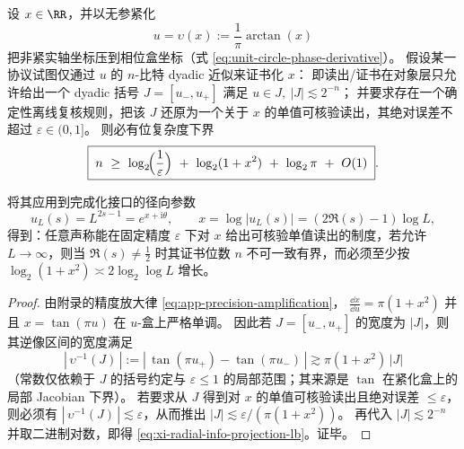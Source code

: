 \begin{theorem}\label{thm:xi-radial-information-projection-lower-bound}
设 \(x\in\RR\)，并以无参紧化
\[
u=\upsilon(x):=\frac{1}{\pi}\arctan(x)
\]
把非紧实轴坐标压到相位盒坐标（式 \eqref{eq:unit-circle-phase-derivative}）。
假设某一协议试图仅通过 \(u\) 的 \(n\)-比特 dyadic 近似来证书化 \(x\)：
即读出/证书在对象层只允许给出一个 dyadic 括号 \(J=[u_-,u_+]\) 满足
\(
u\in J,\ |J|\lesssim 2^{-n}
\)；
并要求存在一个确定性离线复核规则，把该 \(J\) 还原为一个关于 \(x\) 的单值可核验读出，其绝对误差不超过 \(\varepsilon\in(0,1]\)。
则必有位复杂度下界
\begin{equation}\label{eq:xi-radial-info-projection-lb}
\boxed{\;
n\ \ge\ \log_2\!\Bigl(\frac{1}{\varepsilon}\Bigr)\ +\ \log_2(1+x^2)\ +\ \log_2\pi\ +\ O(1)\; }.
\end{equation}
\par
将其应用到完成化接口的径向参数
\[
u_L(s)=L^{2s-1}=e^{x+\mathrm{i}\theta},
\qquad
x=\log|u_L(s)|=(2\Re(s)-1)\log L,
\]
得到：任意声称能在固定精度 \(\varepsilon\) 下对 \(x\) 给出可核验单值读出的制度，若允许 \(L\to\infty\)，则当 \(\Re(s)\neq\tfrac12\) 时其证书位数 \(n\) 不可一致有界，而必须至少按 \(\log_2(1+x^2)\asymp 2\log_2\log L\) 增长。
\end{theorem}

\begin{proof}
由附录的精度放大律 \eqref{eq:app-precision-amplification}，
\(
\frac{\dd x}{\dd u}=\pi(1+x^2)
\)
并且 \(x=\tan(\pi u)\) 在 \(u\)-盒上严格单调。
因此若 \(J=[u_-,u_+]\) 的宽度为 \(|J|\)，则其逆像区间的宽度满足
\[
|\,\upsilon^{-1}(J)\,|
:=|\,\tan(\pi u_+)-\tan(\pi u_-)\,|
\gtrsim \pi(1+x^2)\,|J|
\]
（常数仅依赖于 \(J\) 的括号约定与 \(\varepsilon\le 1\) 的局部范围；其来源是 \(\tan\) 在紧化盒上的局部 Jacobian 下界）。
若要求从 \(J\) 得到对 \(x\) 的单值可核验读出且绝对误差 \(\le\varepsilon\)，则必须有
\(
|\,\upsilon^{-1}(J)\,|\lesssim \varepsilon
\)，从而推出
\(
|J|\lesssim \varepsilon/(\pi(1+x^2))
\)。
再代入 \(|J|\lesssim 2^{-n}\) 并取二进制对数，即得 \eqref{eq:xi-radial-info-projection-lb}。证毕。
\end{proof}

